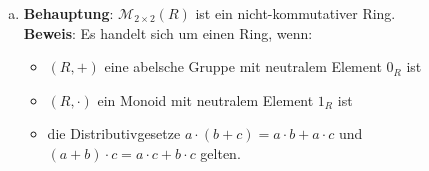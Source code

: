 \documentclass[12pt,a4paper]{article}
\begin{document}
\begin{enumerate}[(a)]
    \item \textbf{Behauptung}: $\mathcal{M}_{2\times2}(R)$ ist ein nicht-kommutativer Ring.\\

    \textbf{Beweis}: Es handelt sich um einen Ring, wenn:
    \begin{itemize}
        \item $(R, +)$ eine abelsche Gruppe mit neutralem Element $0_R$ ist
        \item $(R, \cdot)$ ein Monoid mit neutralem Element $1_R$ ist
        \item die Distributivgesetze $a \cdot (b + c) = a \cdot b + a \cdot c$ und $(a + b) \cdot c = a \cdot c + b \cdot c$ gelten.
    \end{itemize}


\end{enumerate}
\end{document}
